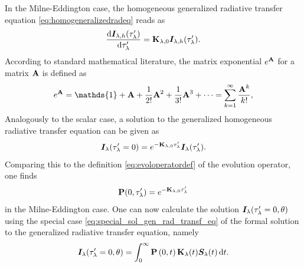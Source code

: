 \documentclass[a4paper,12pt]{report}
\begin{document}
In the Milne-Eddington case, the homogeneous generalized radiative transfer equation \cref{eq:homogeneralizedradeq} reads as \begin{equation}
\frac{\mathrm{d}\bm{I}_{\lambda,h}(\tau_\lambda^\prime)}{\mathrm{d}\tau_\lambda^\prime} = \boldsymbol{\mathbf{K}}_{\lambda,0}\bm{I}_{\lambda,h}(\tau_\lambda^\prime).
\end{equation} According to standard mathematical literature, the matrix exponential $e^{\boldsymbol{\mathbf{A}}}$ for a matrix $\boldsymbol{\mathbf{A}}$ is defined as \begin{equation}
e^{\matr{A}} = \mathds{1} + \matr{A} + \frac{1}{2!}\matr{A}^2 + \frac{1}{3!}\matr{A}^3 + \dots = \sum_{k=1}^{\infty}\frac{\matr{A}^k}{k!},
\end{equation} Analogously to the scalar case, a solution to the generalized homogeneous radiative transfer equation can be given as \begin{equation}
\bm{I}_\lambda(\tau_\lambda^\prime = 0) = e^{-\boldsymbol{\mathbf{K}}_{\lambda,0}\tau_\lambda^\prime}\bm{I}_\lambda(\tau_\lambda^\prime).
\end{equation} Comparing this to the definition \cref{eq:evoloperatordef} of the evolution operator, one finds \begin{equation}
\boldsymbol{\mathbf{P}}(0,\tau_\lambda^\prime) = e^{-\boldsymbol{\mathbf{K}}_{\lambda,0}\tau_\lambda^\prime}
\end{equation} in the Milne-Eddington case. One can now calculate the solution $\bm{I}_\lambda(\tau_\lambda^\prime=0, \theta)$ using the special case \cref{eq:special_sol_gen_rad_transf_eq} of the formal solution to the generalized radiative transfer equation, namely 
\begin{equation}
\bm{I}_\lambda(\tau_\lambda^\prime = 0,\theta) = \int_{0}^{ \infty}\boldsymbol{\mathbf{P}}\left(0,t\right)\boldsymbol{\mathbf{K}}_\lambda(t)\bm{S}_\lambda(t)\,\mathrm{d}t.
\end{equation}
\end{document}
